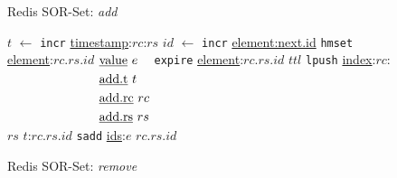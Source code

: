 \begin{figure*}[t]
  \centering
  \noindent
  \begin{minipage}[t]{0.49\linewidth}
    \begin{algorithm}[H]
    \small{
    \caption{Redis SOR-Set: \textit{add}}
    \label{alg:add}
    \centering
    \begin{algorithmic}[1]
 	    \State $t$ $\gets$ \texttt{incr} \underline{timestamp}:$rc$:$rs$
 	    \State $id$ $\gets$ \texttt{incr} \underline{element:next.id}
 	    \State \texttt{hmset} \underline{element}:$rc.rs.id$ $\begin{aligned}[t]
                                                               & \text{\underline{value} } e \\
                                                               & \text{\underline{add.t} } t \\
                                                               & \text{\underline{add.rc} } rc \\
                                                               & \text{\underline{add.rs} } rs
                                                              \end{aligned}$
        \State \texttt{expire} \underline{element}:$rc.rs.id$ $ttl$
        \State \texttt{lpush} \underline{index}:$rc$:$rs$ $t$:$rc.rs.id$
        \State \texttt{sadd} \underline{ids}:$e$ $rc.rs.id$
 	  \EndProcedure
	\end{algorithmic}
    }
    \end{algorithm}
  \end{minipage}
  \noindent
  \begin{minipage}[t]{0.49\linewidth}
    \begin{algorithm}[H]
    \small{
    \caption{Redis SOR-Set: \textit{remove}}
    \label{alg:remove}
    \centering
    }
\end{algorithm}
\end{minipage}
\end{figure*}

